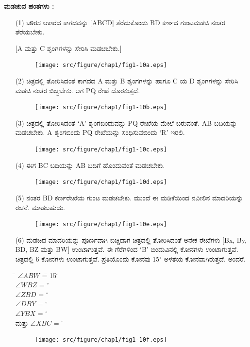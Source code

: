 \noindent
\textbf{ಮಡಚುವ ಹಂತಗಳು :}
\begin{itemize}
\item[(1)] ಚೌರಸ ಆಕಾರದ ಕಾಗದವನ್ನು [ABCD] ತೆರೆದುಕೊಂಡು BD ಕರ್ಣದ ಗುಂಟ\break ಮಡಚಿ ನಂತರ ತೆರೆಯಬೇಕು. 

[A ಮತ್ತು C ಶೃಂಗಗಳನ್ನು ಸೇರಿಸಿ ಮಡಚಬೇಕು.]
\begin{figure}[H]
\centering
\texttt{[image: src/figure/chap1/fig1-10a.eps]}
\end{figure}

\item[(2)] ಚಿತ್ರದಲ್ಲಿ ತೋರಿಸಿದಂತೆ ಕಾಗದದ A ಮತ್ತು  B ಶೃಂಗಗಳನ್ನು ಹಾಗೂ  C ಯ D ಶೃಂಗಗಳನ್ನು ಸೇರಿಸಿ ಮಡಚಿ ನಂತರ ಬಿಚ್ಚಬೇಕು. ಆಗ PQ ರೇಖೆ ದೊರಕುತ್ತದೆ. 
\begin{figure}[H]
\centering
\texttt{[image: src/figure/chap1/fig1-10b.eps]}
\end{figure}

\item[(3)] ಚಿತ್ರದಲ್ಲಿ ತೋರಿಸಿದಂತೆ  `A' ಶೃಂಗಬಿಂದುವನ್ನು PQ ರೇಖೆಯ ಮೇಲೆ ಬರುವಂತೆ.  AB ಬದಿಯನ್ನು ಮಡಚಬೇಕು.  A ಶೃಂಗಬಿಂದು  PQ ರೇಖೆಯನ್ನು ಸಂಧಿಸುವ\break ಬಿಂದು   `R' ಇರಲಿ. 
\begin{figure}[H]
\centering
\texttt{[image: src/figure/chap1/fig1-10c.eps]}
\end{figure}

\item[(4)] ಈಗ BC ಬದಿಯನ್ನು AB ಬದಿಗೆ ಹೊಂದುವಂತೆ ಮಡಚಬೇಕು. 
\begin{figure}[H]
\centering
\texttt{[image: src/figure/chap1/fig1-10d.eps]}
\end{figure}

\item[(5)] ನಂತರ BD ಕರ್ಣರೇಖೆಯ ಗುಂಟ ಮಡಚಬೇಕು. ಮುಂದೆ ಈ ಮಡಿಕೆಯಿಂದ ನವೀಲಿನ ಮಾದರಿಯನ್ನು ರಚನೆ. ಮಾಡಬಹುದು. 
\begin{figure}[H]
\centering
\texttt{[image: src/figure/chap1/fig1-10e.eps]}
\end{figure}

\item[(6)] ಮಡಚಿದ ಮಾದರಿಯನ್ನು ಪೂರ್ಣವಾಗಿ ಬಿಚ್ಚಿದಾಗ ಚಿತ್ರದಲ್ಲಿ ತೋರಿಸಿದಂತೆ ಅನೇಕ ರೇಖೆಗಳು [Bx, By, BD, BZ ಮತ್ತು  BW] ಉಂಟಾಗುತ್ತವೆ. ಈ ಗೆರೆಗಳಿಂದ `B' ಬಿಂದುವಿನಲ್ಲಿ ಕೋನಗಳು ಉಂಟಾಗುತ್ತವೆ. ಚಿತ್ರದಲ್ಲಿ 6 ಕೋನಗಳು ಉಂಟಾಗುತ್ತವೆ. ಪ್ರತಿಯೊಂದು ಕೋನವು  15$^\circ$ ಅಳತೆಯ ಕೋನವಾಗಿರುತ್ತದೆ. ಅಂದರೆ. 
\begin{tabbing}
\= \quad \quad \= $\angle  ABW$ \= = \= 15$^\circ$\\
\> \> $\angle WBZ$ \> = $^\circ$\\
\> \> $\angle  ZBD$ \> = $^\circ$\\
\> \> $\angle  DBY$ \> = $^\circ$\\
\> \> $\angle  YBX$ \> = $^\circ$ \\
ಮತ್ತು \> \> $\angle  XBC$ \> = $^\circ$
\end{tabbing}
\begin{figure}[H]
\centering
\texttt{[image: src/figure/chap1/fig1-10f.eps]}
\end{figure}
\end{itemize}

